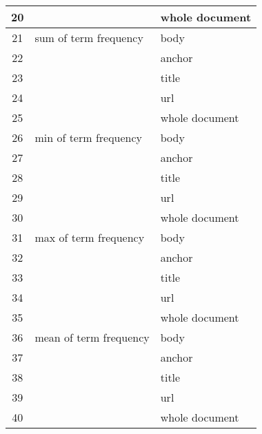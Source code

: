 \begin{longtable}{cll}
20         &                                                     & whole document \\
\midrule21         & sum of term frequency                               & body           \\
22         &                                                     & anchor         \\
23         &                                                     & title          \\
24         &                                                     & url            \\
25         &                                                     & whole document \\
\midrule26         & min of term frequency                               & body           \\
27         &                                                     & anchor         \\
28         &                                                     & title          \\
29         &                                                     & url            \\
30         &                                                     & whole document \\
\midrule31         & max of term frequency                               & body           \\
32         &                                                     & anchor         \\
33         &                                                     & title          \\
34         &                                                     & url            \\
35         &                                                     & whole document \\
\midrule36         & mean of term frequency                              & body           \\
37         &                                                     & anchor         \\
38         &                                                     & title          \\
39         &                                                     & url            \\
40         &                                                     & whole document \\

\end{longtable}
